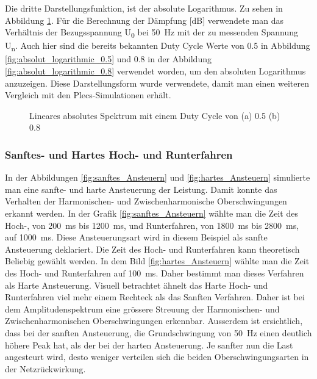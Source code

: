 Die dritte Darstellungsfunktion, ist der absolute Logarithmus. Zu sehen in Abbildung \ref{fig:absolut_logaritmic_matlab}. Für die Berechnung der Dämpfung [dB] verwendete man das Verhältnis der Bezugsspannung U\textsubscript{0} bei \SI{50}{Hz} mit der zu messenden Spannung U\textsubscript{n}. Auch hier sind die bereits bekannten Duty Cycle Werte von 0.5 in Abbildung  \ref{fig:absolut_logarithmic_0.5} und 0.8 in der Abbildung \ref{fig:absolut_logarithmic_0.8} verwendet worden, um den absoluten Logarithmus anzuzeigen. Diese Darstellungsform  wurde verwendete, damit man einen weiteren Vergleich mit den Plecs-Simulationen erhält.


\begin{figure}[ht!]
	\centering
	\qquad
	\caption{Lineares absolutes Spektrum mit einem Duty Cycle von (a) 0.5 (b) 0.8}
	\label{fig:absolut_logaritmic_matlab}
\end{figure}

\subsubsection{Sanftes- und Hartes Hoch- und Runterfahren}

In der Abbildungen \ref{fig:sanftes_Ansteuern} und \ref{fig:hartes_Ansteuern} simulierte man eine sanfte- und harte Ansteuerung der Leistung. Damit konnte das Verhalten der Harmonischen- und Zwischenharmonische Oberschwingungen erkannt werden. In der Grafik \ref{fig:sanftes_Ansteuern} wählte man die Zeit des Hoch-, von \SI{200}{ms} bis \SI{1200}{ms}, und Runterfahren, von \SI{1800}{ms} bis \SI{2800}{ms}, auf \SI{1000}{ms}. Diese Ansteuerungsart wird in diesem Beispiel als sanfte Ansteuerung deklariert. Die Zeit des Hoch- und Runterfahren kann theoretisch Beliebig gewählt werden. In dem Bild \ref{fig:hartes_Ansteuern} wählte man die Zeit des Hoch- und Runterfahren auf \SI{100}{ms}. Daher bestimmt man dieses Verfahren als Harte Ansteuerung. Visuell betrachtet ähnelt das Harte Hoch- und Runterfahren viel mehr einem Rechteck als das Sanften Verfahren. Daher ist bei dem Amplitudenspektrum eine grössere Streuung der Harmonischen- und Zwischenharmonischen Oberschwingungen erkennbar. Ausserdem ist ersichtlich, dass bei der sanften Ansteuerung, die Grundschwingung von \SI{50}{Hz} einen deutlich höhere Peak hat, als der bei der harten Ansteuerung. Je sanfter nun die Last angesteurt wird, desto weniger verteilen sich die beiden Oberschwingungsarten in der Netzrückwirkung.


